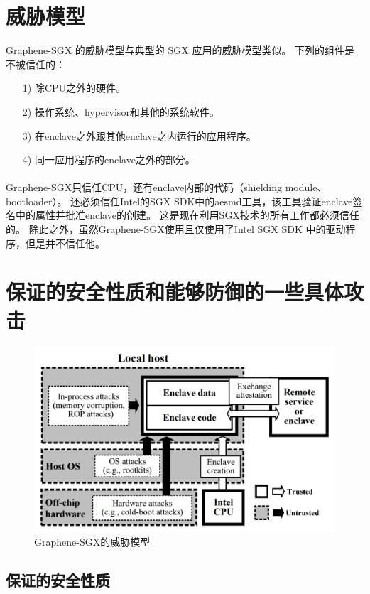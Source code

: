 \section{威胁模型}
Graphene-SGX 的威胁模型与典型的 SGX 应用的威胁模型类似。
下列的组件是不被信任的：
\begin{itemize}
    \item [1)] 
    除CPU之外的硬件。
    \item [2)]
    操作系统、hypervisor和其他的系统软件。
    \item [3)]
    在enclave之外跟其他enclave之内运行的应用程序。
    \item [4)]
    同一应用程序的enclave之外的部分。
\end{itemize}   
\paragraph{}
Graphene-SGX只信任CPU，还有enclave内部的代码（shielding module、bootloader）。
还必须信任Intel的SGX SDK中的aesmd工具，该工具验证enclave签名中的属性并批准enclave的创建。
这是现在利用SGX技术的所有工作都必须信任的。
除此之外，虽然Graphene-SGX使用且仅使用了Intel SGX SDK 中的驱动程序，但是并不信任他。

\section{保证的安全性质和能够防御的一些具体攻击}
\begin{figure}
    \centering
    \includegraphics[scale=0.35]{Figures/SGX/threatmodel.png}
    \decoRule
    \caption{Graphene-SGX的威胁模型}
    \label{fig:Graphene}
\end{figure}

\subsection{保证的安全性质}
